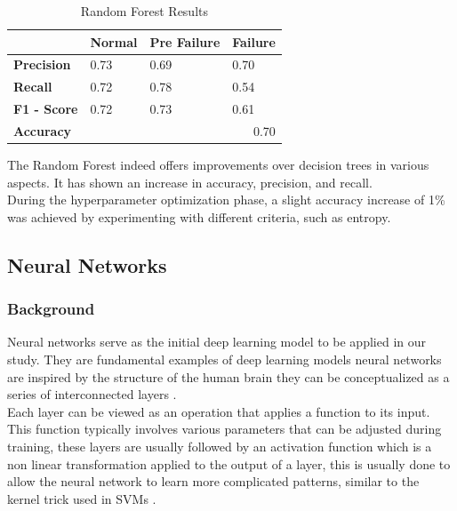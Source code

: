 \documentclass{article}
\begin{document}
\begin{table}[htbp]
\centering
\caption{Random Forest Results}
\begin{tabular}{|l|lll|}
\hline
                    & \multicolumn{1}{l|}{\textbf{Normal}} & \multicolumn{1}{l|}{\textbf{Pre Failure}} & \textbf{Failure} \\ \hline
\textbf{Precision}  & \multicolumn{1}{l|}{0.73}            & \multicolumn{1}{l|}{0.69}                 & 0.70             \\ \hline
\textbf{Recall}     & \multicolumn{1}{l|}{0.72}            & \multicolumn{1}{l|}{0.78}                 & 0.54             \\ \hline
\textbf{F1 - Score} & \multicolumn{1}{l|}{0.72}            & \multicolumn{1}{l|}{0.73}                 & 0.61             \\ \hline
\textbf{Accuracy}   & \multicolumn{3}{r|}{0.70}                                                                           \\ \hline
\end{tabular}
\end{table}

The Random Forest indeed offers improvements over decision trees in various aspects. It has shown an increase in accuracy, precision, and recall.\\

During the hyperparameter optimization phase, a slight accuracy increase of 1\% was achieved by experimenting with different criteria, such as entropy.

\subsection{Neural Networks}
\subsubsection{Background}

Neural networks serve as the initial deep learning model to be applied in our study. They are fundamental examples of deep learning models neural networks are inspired by the structure of the human brain they can be conceptualized as a series of interconnected layers \cite{Goodfellow2016}.\\ 

Each layer can be viewed as an operation that applies a function to its input. This function typically involves various parameters that can be adjusted during training, these layers are usually followed by an activation function which is a non linear transformation applied to the output of a layer, this is usually done to allow the neural network to learn more complicated patterns, similar to the kernel trick used in SVMs \cite{Goodfellow2016}. \\
\end{document}
